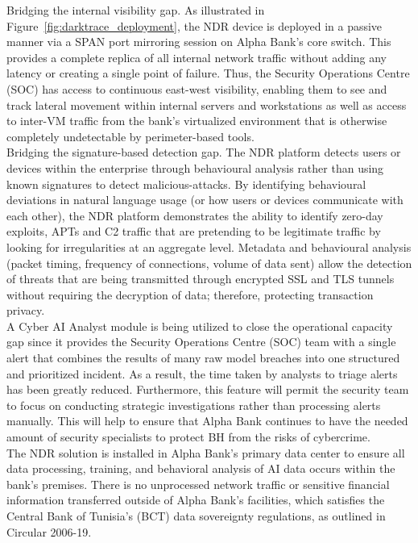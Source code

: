 \documentclass[12pt,a4paper]{report}
\begin{document}
Bridging the internal visibility gap. As illustrated in Figure~\ref{fig:darktrace_deployment}, the NDR device is deployed in a passive manner via a SPAN port mirroring session on Alpha Bank’s core switch. This provides a complete replica of all internal network traffic without adding any latency or creating a single point of failure. Thus, the Security Operations Centre (SOC) has access to continuous east-west visibility, enabling them to see and track lateral movement within internal servers and workstations as well as access to inter-VM traffic from the bank’s virtualized environment that is otherwise completely undetectable by perimeter-based tools.\\

Bridging the signature-based detection gap. The NDR platform detects users or devices within the enterprise through behavioural analysis rather than using known signatures to detect malicious-attacks. By identifying behavioural deviations in natural language usage (or how users or devices communicate with each other), the NDR platform demonstrates the ability to identify zero-day exploits, APTs and C2 traffic that are pretending to be legitimate traffic by looking for irregularities at an aggregate level. Metadata and behavioural analysis (packet timing, frequency of connections, volume of data sent) allow the detection of threats that are being transmitted through encrypted SSL and TLS tunnels without requiring the decryption of data; therefore, protecting transaction privacy.\\

A Cyber AI Analyst module is being utilized to close the operational capacity gap since it provides the Security Operations Centre (SOC) team with a single alert that combines the results of many raw model breaches into one structured and prioritized incident. As a result, the time taken by analysts to triage alerts has been greatly reduced. Furthermore, this feature will permit the security team to focus on conducting strategic investigations rather than processing alerts manually. This will help to ensure that Alpha Bank continues to have the needed amount of security specialists to protect BH from the risks of cybercrime.\\

The NDR solution is installed in Alpha Bank’s primary data center to ensure all data processing, training, and behavioral analysis of AI data occurs within the bank's premises. There is no unprocessed network traffic or sensitive financial information transferred outside of Alpha Bank's facilities, which satisfies the Central Bank of Tunisia’s (BCT) data sovereignty regulations, as outlined in Circular 2006-19.
\end{document}
